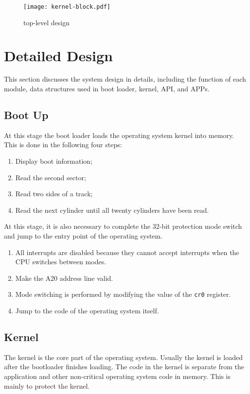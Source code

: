 \documentclass{swfcthesis}
\begin{document}
\begin{figure}%
  \centering
  \texttt{[image: kernel-block.pdf]}
  \caption{top-level design}
  \label{fig:top-level}
\end{figure}


\section{Detailed Design}
\label{sec:detailed-design}

This section discusses the system design in details, including the function of each
module, data structures used in boot loader, kernel, API, and APPs.

\subsection{Boot Up}
\label{sec:boot-up}

At this stage the boot loader loads the operating system kernel into memory. This is done
in the following four steps:
\begin{enumerate}
\item Display boot information;
\item Read the second sector;
\item Read two sides of a track;
\item Read the next cylinder until all twenty cylinders have been read.
\end{enumerate}

At this stage, it is also necessary to complete the 32-bit protection mode switch and jump
to the entry point of the operating system.
\begin{enumerate}
\item All interrupts are disabled because they cannot accept interrupts when the CPU
  switches between modes.
\item Make the A20 address line valid.
\item Mode switching is performed by modifying the value of the \texttt{cr0} register.
\item Jump to the code of the operating system itself.  
\end{enumerate}

\subsection{Kernel}
\label{sec:kernel}

The kernel is the core part of the operating system. Usually the kernel is loaded after
the bootloader finishes loading. The code in the kernel is separate from the application
and other non-critical operating system code in memory. This is mainly to protect the
kernel.
\end{document}
